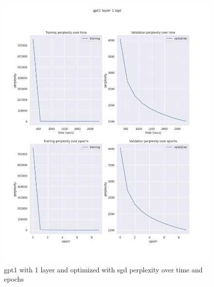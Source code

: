 \documentclass[12pt]{article}
\theoremstyle{definition}
\begin{document}
\begin{figure}[H]
     \centering
     \includegraphics[scale=0.4]{gpt1_layer_1_sgd.png}
     \caption{gpt1 with 1 layer and optimized with sgd perplexity over time and epochs}
\end{figure}
\end{document}
